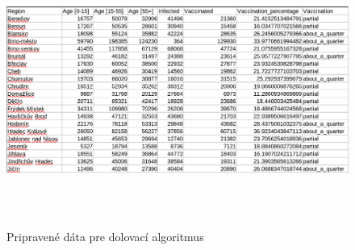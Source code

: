 \documentclass[a4paper, 16pt]{article}
\begin{document}
\begin{figure}[H] \centering
    \includegraphics[width=\linewidth,height=3.5in]{queryC.png}
    \caption{Pripravené dáta pre dolovací algoritmus}
    \label{graf_c}
\end{figure}

	
\end{document}
